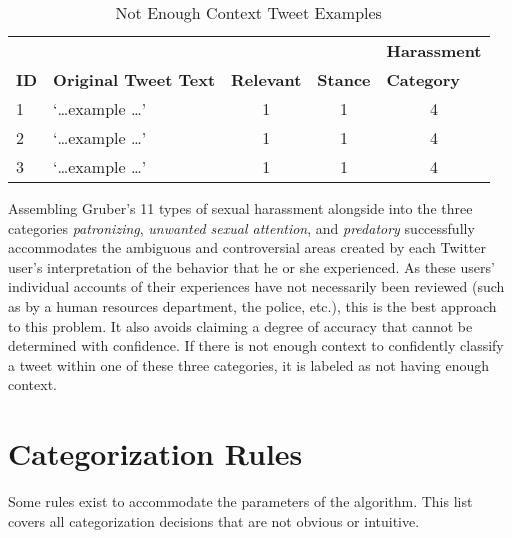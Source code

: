 \begin{table}[H]
    \centering
    \caption{Not Enough Context Tweet Examples}
    \begin{tabular}{m{1cm} m{8cm} m{1.5cm} m{1.1cm} m{2.1cm}}
        \toprule
        & {} & {} & {} & {\textbf{Harassment}} \\
        \rowcolor{White}\textbf{ID} & {\textbf{Original Tweet Text}} & {\textbf{Relevant}} & {\textbf{Stance}} & {\textbf{Category}} \\
                \midrule
        1 & `\ldots example \ldots' & \multicolumn{1}{c}{1} & \multicolumn{1}{c}{1} & \multicolumn{1}{c}{4}\\
        2 & `\ldots example \ldots' & \multicolumn{1}{c}{1} & \multicolumn{1}{c}{1} & \multicolumn{1}{c}{4}\\
        3 & `\ldots example \ldots' & \multicolumn{1}{c}{1} & \multicolumn{1}{c}{1} & \multicolumn{1}{c}{4}\\
        \bottomrule
    \end{tabular}
\end{table}

Assembling Gruber's 11 types of sexual harassment alongside into the three categories \textit{patronizing}, \textit{unwanted sexual attention}, and \textit{predatory} successfully accommodates the ambiguous and controversial areas created by each Twitter user's interpretation of the behavior that he or she experienced. As these users' individual accounts of their experiences have not necessarily been reviewed (such as by a human resources department, the police, etc.), this is the best approach to this problem. It also avoids claiming a degree of accuracy that cannot be determined with confidence. If there is not enough context to confidently classify a tweet within one of these three categories, it is labeled as not having enough context.

\section{Categorization Rules}

Some rules exist to accommodate the parameters of the algorithm. This list covers all categorization decisions that are not obvious or intuitive.

